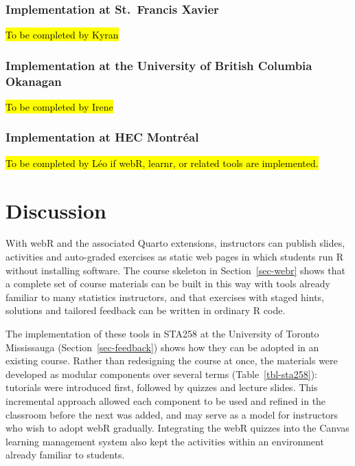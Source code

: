 \documentclass[
  12pt]{article}
\begin{document}
\subsubsection{Implementation at St.~Francis
Xavier}\label{implementation-at-st.-francis-xavier}

\hl{To be completed by Kyran}

\subsubsection{Implementation at the University of British Columbia
Okanagan}\label{implementation-at-the-university-of-british-columbia-okanagan}

\hl{To be completed by Irene}

\subsubsection{Implementation at HEC
Montréal}\label{implementation-at-hec-montruxe9al}

\hl{To be completed by Léo if webR, learnr, or related tools are implemented.}

\section{Discussion}\label{sec-discussion}

With webR and the associated Quarto extensions, instructors can publish
slides, activities and auto-graded exercises as static web pages in
which students run R without installing software. The course skeleton in
Section~\ref{sec-webr} shows that a complete set of course materials can
be built in this way with tools already familiar to many statistics
instructors, and that exercises with staged hints, solutions and
tailored feedback can be written in ordinary R code.

The implementation of these tools in STA258 at the University of Toronto
Mississauga (Section~\ref{sec-feedback}) shows how they can be adopted
in an existing course. Rather than redesigning the course at once, the
materials were developed as modular components over several terms
(Table~\ref{tbl-sta258}): tutorials were introduced first, followed by
quizzes and lecture slides. This incremental approach allowed each
component to be used and refined in the classroom before the next was
added, and may serve as a model for instructors who wish to adopt webR
gradually. Integrating the webR quizzes into the Canvas learning
management system also kept the activities within an environment already
familiar to students.
\end{document}
